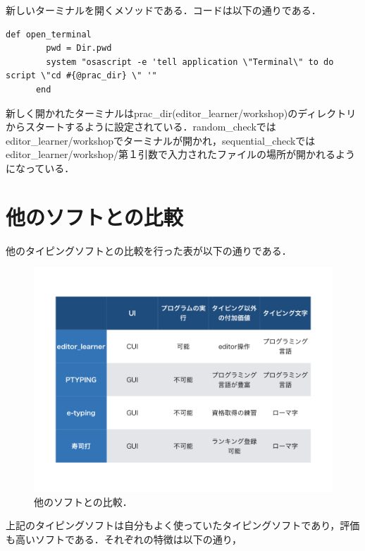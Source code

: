 \documentclass[11pt,dvipdfmx]{jsarticle}
\begin{document}
新しいターミナルを開くメソッドである．コードは以下の通りである．

\begin{verbatim}
def open_terminal
        pwd = Dir.pwd
        system "osascript -e 'tell application \"Terminal\" to do script \"cd #{@prac_dir} \" '"
      end
\end{verbatim}

新しく開かれたターミナルはprac\_dir(editor\_learner/workshop)のディレクトリからスタートするように設定されている．random\_checkではeditor\_learner/workshopでターミナルが開かれ，sequential\_checkではeditor\_learner/workshop/第１引数で入力されたファイルの場所が開かれるようになっている．

    \section{他のソフトとの比較}\label{ux4ed6ux306eux30bdux30d5ux30c8ux3068ux306eux6bd4ux8f03}

他のタイピングソフトとの比較を行った表が以下の通りである．

\begin{figure}[H]
\centering
\begin{center}
\includegraphics[width=150mm]{../../picture/compare.jpeg}
\end{center}
\caption{他のソフトとの比較．\label{compare}}

\label{fig:}
\end{figure}

上記のタイピングソフトは自分もよく使っていたタイピングソフトであり，評価も高いソフトである．それぞれの特徴は以下の通り，
\end{document}
